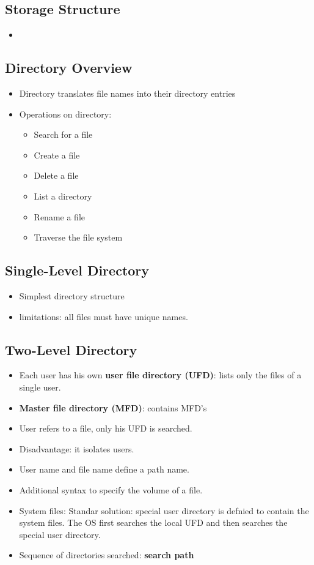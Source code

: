 \documentclass[10pt]{report}
\begin{document}
		\subsection{Storage Structure}
			\begin{itemize}
					\item
			\end{itemize}

		\subsection{Directory Overview}
			\begin{itemize}
					\item Directory translates file names into their directory entries
					\item Operations on directory:
					\begin{itemize}
							\item Search for a file
							\item Create a file
							\item Delete a file
							\item List a directory
							\item Rename a file
							\item Traverse the file system
					\end{itemize}
			\end{itemize}

		\subsection{Single-Level Directory}
			\begin{itemize}
					\item Simplest directory structure
					\item limitations: all files must have unique names.
			\end{itemize}

		\subsection{Two-Level Directory}
			\begin{itemize}
					\item Each user has his own \textbf{user file directory (UFD)}: lists only the files of a single user.
					\item \textbf{Master file directory (MFD)}: contains MFD's
					\item User refers to a file, only his UFD is searched.
					\item Disadvantage: it isolates users.
					\item User name and file name define a path name.
					\item Additional syntax to specify the volume of a file.
					\item System files: Standar solution: special user directory is defnied to contain the system files. The OS first searches the local UFD and then searches the special user directory.
					\item Sequence of directories searched: \textbf{search path}
			\end{itemize}
\end{document}
